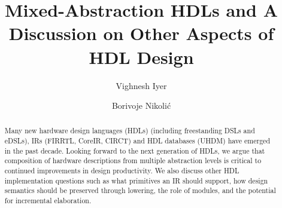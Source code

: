 \documentclass[sigplan,review,nonacm,9pt]{acmart}
\begin{document}
\title{Mixed-Abstraction HDLs and A Discussion on Other Aspects of HDL Design}


\author{Vighnesh Iyer}

\author{Borivoje Nikolić}




\begin{abstract}

Many new hardware design languages (HDLs) (including freestanding DSLs and eDSLs), IRs (FIRRTL, CoreIR, CIRCT) and HDL databases (UHDM) have emerged in the past decade.
Looking forward to the next generation of HDLs, we argue that composition of hardware descriptions from multiple abstraction levels is critical to continued improvements in design productivity.
We also discuss other HDL implementation questions such as what primitives an IR should support, how design semantics should be preserved through lowering, the role of modules, and the potential for incremental elaboration.
\end{abstract}
\end{document}
